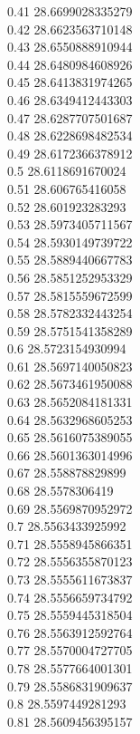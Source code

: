 {0.41	28.6699028335279\\
0.42	28.6623563710148\\
0.43	28.6550888910944\\
0.44	28.6480984608926\\
0.45	28.6413831974265\\
0.46	28.6349412443303\\
0.47	28.6287707501687\\
0.48	28.6228698482534\\
0.49	28.6172366378912\\
0.5	28.6118691670024\\
0.51	28.606765416058\\
0.52	28.601923283293\\
0.53	28.5973405711567\\
0.54	28.5930149739722\\
0.55	28.5889440667783\\
0.56	28.5851252953329\\
0.57	28.5815559672599\\
0.58	28.5782332443254\\
0.59	28.5751541358289\\
0.6	28.5723154930994\\
0.61	28.5697140050823\\
0.62	28.5673461950088\\
0.63	28.5652084181331\\
0.64	28.5632968605253\\
0.65	28.5616075389055\\
0.66	28.5601363014996\\
0.67	28.558878829899\\
0.68	28.5578306419\\
0.69	28.5569870952972\\
0.7	28.5563433925992\\
0.71	28.5558945866351\\
0.72	28.5556355870123\\
0.73	28.5555611673837\\
0.74	28.5556659734792\\
0.75	28.5559445318504\\
0.76	28.5563912592764\\
0.77	28.5570004727705\\
0.78	28.5577664001301\\
0.79	28.5586831909637\\
0.8	28.5597449281293\\
0.81	28.5609456395157\\
}
